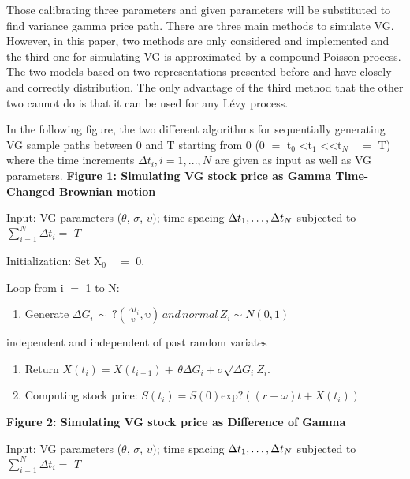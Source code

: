 Those calibrating three parameters and given parameters will be substituted 
to find variance gamma price path. There are three main methods to simulate 
VG. However, in this paper, two methods are only considered and implemented 
and the third one for simulating VG is approximated by a compound Poisson 
process. The two models based on two representations presented before and 
have closely and correctly distribution. The only advantage of the third 
method that the other two cannot do is that it can be used for any L\'{e}vy 
process. 

In the following figure, the two different algorithms for sequentially 
generating VG sample paths between 0 and T starting from 0 (0 $=$ t$_{0}$ 
\textless t$_{1}$ \textless \textellipsis \textless t$_{N} \quad =$ T) where the 
time increments $\Delta t_i, i=1,...,N$ are given as input as well as VG 
parameters.
\textbf{Figure 1: Simulating VG stock price as Gamma Time-Changed Brownian 
motion}

Input: VG parameters ($\theta $, $\sigma $, $\upsilon )$; time spacing 
$\Delta t_{1},\mathellipsis ,\Delta t_{N}$ subjected to $\sum\limits_{i=1}^N 
{\Delta t_{i}=\, \, T} $

Initialization: Set X$_{0} \quad =$ 0.

Loop from i $=$ 1 to N:

\begin{enumerate}
\item Generate $\Delta G_{i}\, \sim \, ?\left( \frac{\Delta t_{i}}{\mathrm{\upsilon }},\mathrm{\upsilon } \right)\, and\, normal\, Z_{i}\sim N\left( 0,1 \right)$
\end{enumerate}
independent and independent of past random variates

\begin{enumerate}
\item Return $X\left( t_{i} \right)=X\left( t_{i-1} \right)+\, \theta \Delta G_{i}+\sigma \sqrt {\Delta G_{i}} Z_{i}$.
\item Computing stock price: $S\left( t_{i} \right)=S\left( 0 \right)\mathrm{exp?}\left( \left( r+\omega \right)t+X\left( t_{i} \right) \right)$
\end{enumerate}

\textbf{Figure 2: Simulating VG stock price as Difference of Gamma}

Input: VG parameters ($\theta $, $\sigma $, $\upsilon )$; time spacing 
$\Delta t_{1},\mathellipsis ,\Delta t_{N}$ subjected to $\sum\limits_{i=1}^N 
{\Delta t_{i}=\, \, T} $

